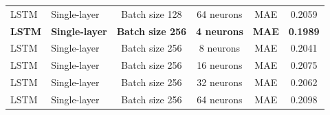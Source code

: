 \begin{landscape}
\begin{longtable}{llcccc}
LSTM & Single-layer & Batch size 128 & 64 neurons & MAE  & 0.2059 \\
\textbf{LSTM} & \textbf{Single-layer} & \textbf{Batch size 256} & \textbf{4 neurons}  & \textbf{MAE}  & \textbf{0.1989} \\
LSTM & Single-layer & Batch size 256 & 8 neurons  & MAE  & 0.2041 \\
LSTM & Single-layer & Batch size 256 & 16 neurons & MAE  & 0.2075 \\
LSTM & Single-layer & Batch size 256 & 32 neurons & MAE  & 0.2062 \\
LSTM & Single-layer & Batch size 256 & 64 neurons & MAE  & 0.2098 \\



\end{longtable}
\end{landscape}
